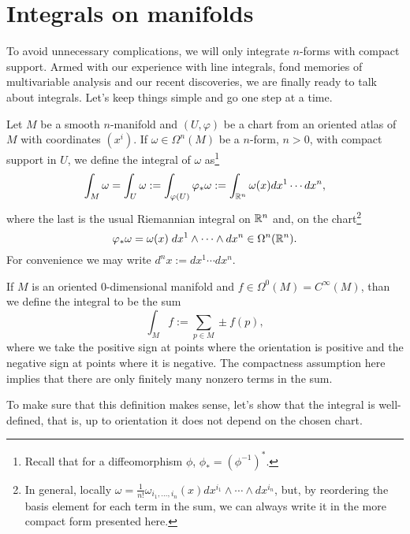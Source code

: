 \section{Integrals on manifolds}

To avoid unnecessary complications, we will only integrate $n$-forms with compact support.
Armed with our experience with line integrals, fond memories of multivariable analysis and our recent discoveries, we are finally ready to talk about integrals.
Let's keep things simple and go one step at a time.

\begin{definition}\label{def:intnform:chart}
  Let $M$ be a smooth $n$-manifold and $(U,\varphi)$ be a chart from an oriented atlas of $M$ with coordinates $(x^i)$.
  If $\omega\in\Omega^n(M)$ be a $n$-form, $n > 0$, with compact support in $U$, we define the integral of $\omega$ as\footnote{Recall that for a diffeomorphism $\phi$, $\phi_* = (\phi^{-1})^*$.}
  \begin{equation}
    \int_M \omega = \int_U \omega := \int_{\varphi(U)} \varphi_*\omega := \int_{\mathbb{R}^n} \omega(x) d x^1\cdots dx^n,
  \end{equation}
  where the last is the usual Riemannian integral on $\mathbb{R}^n$ and, on the chart\footnote{In general, locally $\omega = \frac1{n!}\omega_{i_1,\ldots,i_n}(x) dx^{i_1}\wedge\cdots\wedge dx^{i_n}$, but, by reordering the basis element for each term in the sum, we can always write it in the more compact form presented here.}
  \begin{equation}
    \varphi_*\omega = \omega(x)\; dx^{1}\wedge \cdots\wedge dx^{n}\in\Omega^n(\mathbb{R}^n).
  \end{equation}
  For convenience we may write $d^n x := dx^1 \cdots dx^n$.

  If $M$ is an oriented $0$-dimensional manifold and $f\in\Omega^0(M) = C^\infty(M)$, than we define the integral to be the sum
  \begin{equation}
    \int_M f := \sum_{p\in M} \pm f(p),
  \end{equation}
  where we take the positive sign at points where the orientation is positive and the negative sign at points where it is negative.
  The compactness assumption here implies that there are only finitely many nonzero terms in the sum.
\end{definition}

To make sure that this definition makes sense, let's show that the integral is well-defined, that is, up to orientation it does not depend on the chosen chart.

